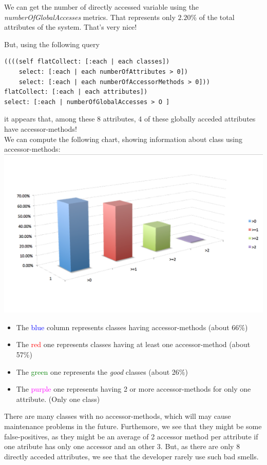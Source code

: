 \documentclass[11pt,a4paper]{article}
\begin{document}
We can get the number of directly accessed variable using the \textit{numberOfGlobalAccesses} metrics. That represents only $2.20\%$ of the total attributes of the system. That's very nice!

But, using the following query\\
\begin{lstlisting}
((((self flatCollect: [:each | each classes])
	select: [:each | each numberOfAttributes > 0])
	select: [:each | each numberOfAccessorMethods > 0]))
flatCollect: [:each | each attributes])
select: [:each | numberOfGlobalAccesses > O ]
\end{lstlisting}
it appears that, among these 8 attributes, 4 of these globally acceded attributes have accessor-methods!\\

We can compute the following chart, showing information about class using accessor-methods:\\
\includegraphics[width=\textwidth]{accessor.png}
\begin{itemize} 
\item The \textcolor{blue}{blue} column represents classes having accessor-methods (about 66\%)
\item The \textcolor{red}{red} one represents classes having at least one accessor-method (about 57\%)
\item The \textcolor{green}{green} one represents the \textit{good} classes (about 26\%)
\item The \textcolor{magenta}{purple} one represents having 2 or more accessor-methods for only one attribute. (Only one class)
\end{itemize}
There are many classes with no accessor-methods, which will may cause maintenance problems in the future. Furthemore, we see that they might be some false-positives, as they might be an average of 2 accessor method per attribute if one atribute has only one accessor and an other 3. But, as there are only 8 directly acceded attributes, we see that the developer rarely use such bad smells.  
\end{document}
